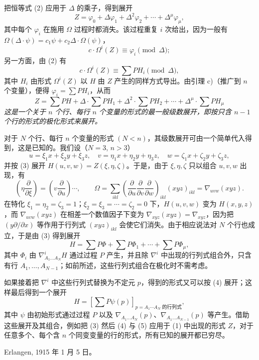 把恒等式 (2) 应用于 $\Delta$ 的乘子，得到展开
\[
  Z=\varphi_0+\Delta\varphi_1+\Delta^2\varphi_2+\cdots+\Delta^\mu\varphi_\mu,
\]
其中每个 $\varphi_i$ 在施用 $\Omega$ 过程时都消失。该过程重复 $i$ 次给出，因为一般有 $\Omega(\Delta\cdot\psi)=c_1\psi+c_2\Delta\cdot\Omega(\psi)$，
\[
  c\cdot \Omega^i(Z)\equiv\varphi_i\pmod{\Delta};
\]
另一方面，由 (2) 有
\[
  c\cdot\Omega^i(Z)\equiv\sum PH_i\pmod{\Delta},
\]
其中 $H_i$ 由形式 $\Omega^i(Z)$ 以 $H$ 由 $Z$ 产生的同样方式导出。由引理 c)（推广到 $n$ 个变量），便得 $\varphi_i=\sum PH_i$，从而
\begin{equation}
  Z=\sum PH+\Delta\cdot\sum PH_1+\Delta^2\cdot\sum PH_2+
  \cdots+\Delta^\mu\cdot\sum PH_\mu
\tag{3}
\end{equation}
\emph{这是一个关于 $n$ 个行、每行 $n$ 个变量的形式的最一般级数展开，即按只含 $n-1$ 个行的形式的极化形式来展开。}

对于 $N$ 个行、每行 $n$ 个变量的形式 $(N<n)$，其级数展开可由一个简单代入得到，这是已知的。我们设（$N=3$, $n>3$）
\[
  u=\xi_1x+\xi_2y+\xi_3z,
  \quad v=\eta_1x+\eta_2y+\eta_3z,
  \quad w=\zeta_1x+\zeta_2y+\zeta_3z,
\]
并按 (3) 展开 $H(u,v,w)=Z(\xi,\eta,\zeta)$。于是，由于 $\xi,\eta,\zeta$ 只以组合 $u,v,w$ 出现，有
\[
  \left(\eta\frac{\partial}{\partial \xi}\right)=
  \left(v\frac{\partial}{\partial u}\right)\cdots,
  \qquad
  \Omega=\sum_{ikl}\left(\frac{\partial}{\partial u}
  \frac{\partial}{\partial v}
  \frac{\partial}{\partial w}\right)_{ikl}(xyz)_{ikl}
  =\nabla_{uvw}(xyz).
\]
在特化 $\xi_1=\eta_2=\zeta_3=1$；$\xi_2=\xi_3=\cdots=\zeta_2=0$ 下，$H(u,v,w)$ 变为 $H(x,y,z)$，而 $\nabla_{uvw}(xyz)$ 在相差一个数值因子下变为 $\nabla_{xyz}(xyz)=\nabla_{xyz}$，因为把 $(y\partial/\partial x)$ 等作用于行列式 $(xyz)_{ikl}$ 会使它们消失。由于相应说法对 $N$ 个行也成立，于是由 (3) 得到展开
\begin{equation}
  H=\sum P\Phi+\sum P\Phi_1+\cdots+\sum P\Phi_\mu,
\tag{4}
\end{equation}
其中 $\Phi_i$ 由 $\nabla^i_{A_1\ldots A_N}H$ 通过过程 $P$ 产生，并且除 $\nabla^i$ 中出现的行列式组合外，只含有行 $A_1,\ldots,A_{N-1}$；如前所述，这些行列式组合在极化时不需考虑。

如果接着把 $\nabla^i$ 中这些行列式替换为不定元 $p$，得到的形式又可以按 (4) 展开；这样最后得到一个展开
\begin{equation}
  H=\left[\sum P\psi(p)\right]_{p=\text{$A_1\cdots A_N$ 的行列式}},
\tag{5}
\end{equation}
其中 $\psi$ 由初始形式通过过程 $P$ 以及 $\nabla_{A_1\ldots A_N}(p)$、$\nabla_{A_1\ldots A_{N-1}}(p)$ 等产生。借助这些展开及其组合，例如把 (3) 然后 (4) 与 (5) 应用于 (1) 中出现的形式 $Z$，对于任意多个、每个含 $n$ 个同变变量的行的形式，所有已知的展开都已穷尽。

Erlangen, 1915 年 1 月 5 日。
